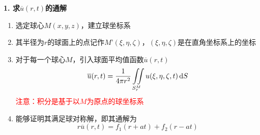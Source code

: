 \noindent \textbf{1. 求$\overline{u}(r,t)$的通解}
\begin{enumerate}[\hspace*{2em} (1) ]
	\item 选定球心$M(x,y,z)$，建立球坐标系
	\item 其半径为$r$的球面上的点记作$M’(\xi,\eta,\zeta)$，$(\xi,\eta,\zeta)$是在直角坐标系上的坐标
	\item 对于每一个球心$M$，引入球面平均值函数$\overline{u}(r,t)$
	\begin{equation}
		\overline{u}(r,t) = \dfrac{1}{4 \pi r^2} \iint \limits_{S_{r}^M} u(\xi,\eta,\zeta,t) \, {\rm{d}} S
	\end{equation}
	\textcolor{red}{注意：积分是基于以$M$为原点的球坐标系}
	\item 能够证明其满足球对称解，即其通解为
	\begin{equation}
		r\overline{u}(r, t) = f_1(r+at) + f_2(r- at)
	\end{equation}
\end{enumerate}

